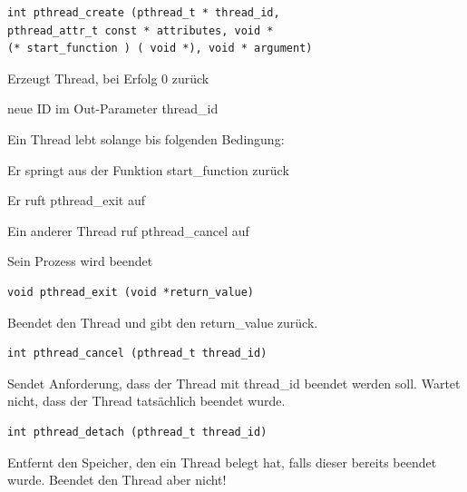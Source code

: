 \begin{multicols*}{5}
	\begin{lstlisting}
int pthread_create (pthread_t * thread_id, 
pthread_attr_t const * attributes, void * 
(* start_function ) ( void *), void * argument)
	\end{lstlisting}
	\vspace{-6pt}
	\begin{compactitem}[$\bullet$]
		\item Erzeugt Thread, bei Erfolg 0 zurück
		\item neue ID im Out-Parameter thread\_id
	\end{compactitem}
	
	\vspace{-2pt}
	\drule{\linewidth}{1pt}

	Ein Thread \textcolor{h}{lebt solange bis} folgenden Bedingung:
		\begin{compactitem}[$\bullet$]
			\item Er springt aus der Funktion start\_function zurück
			\item Er ruft pthread\_exit auf
			\item Ein anderer Thread ruf pthread\_cancel auf
			\item Sein Prozess wird beendet
		\end{compactitem}

	\vspace{-5pt}
					
				
	\begin{lstlisting}
void pthread_exit (void *return_value)
	\end{lstlisting}
	\vspace{-5pt}
	Beendet den Thread und gibt den return\_value zurück.

	\vspace{-5pt}

	\begin{lstlisting}
int pthread_cancel (pthread_t thread_id)
	\end{lstlisting}
	\vspace{-5pt}
	Sendet Anforderung, dass der Thread mit thread\_id beendet werden soll. Wartet nicht, dass der Thread tatsächlich beendet wurde.

	\vspace{-5pt}

	\begin{lstlisting}
int pthread_detach (pthread_t thread_id)
	\end{lstlisting}
	\vspace{-5pt}
	Entfernt den Speicher, den ein Thread belegt hat, falls dieser bereits beendet wurde. Beendet den Thread aber nicht!


\end{multicols*}
